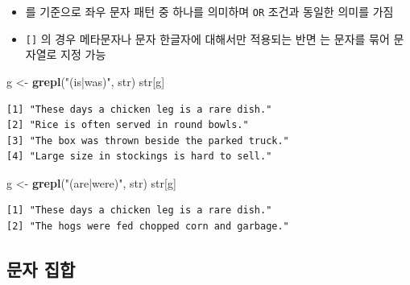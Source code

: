 \documentclass[
  11pt,
]{krantz}
\newenvironment{Shaded}{\begin{snugshade}}{\end{snugshade}}
\newcommand{\KeywordTok}[1]{\textcolor[rgb]{0.27,0.27,0.27}{\textbf{#1}}}
\newcommand{\NormalTok}[1]{#1}
\newcommand{\StringTok}[1]{\textcolor[rgb]{0.5,0.5,0.5}{#1}}
\providecommand{\tightlist}{%
  \setlength{\itemsep}{0pt}\setlength{\parskip}{0pt}}
\begin{document}
\begin{itemize}
\tightlist
\item
  \texttt{\textbar{}}를 기준으로 좌우 문자 패턴 중 하나를 의미하며 \texttt{OR} 조건과 동일한 의미를 가짐
\item
  \texttt{{[}{]}} 의 경우 메타문자나 문자 한글자에 대해서만 적용되는 반면 \texttt{\textbar{}}는 문자를 묶어 문자열로 지정 가능
\end{itemize}

\footnotesize

\begin{Shaded}
\begin{Highlighting}[]
\NormalTok{g <-}\StringTok{ }\KeywordTok{grepl}\NormalTok{(}\StringTok{"(is|was)"}\NormalTok{, str)}
\NormalTok{str[g]}
\end{Highlighting}
\end{Shaded}

\begin{verbatim}
[1] "These days a chicken leg is a rare dish."   
[2] "Rice is often served in round bowls."       
[3] "The box was thrown beside the parked truck."
[4] "Large size in stockings is hard to sell."   
\end{verbatim}

\begin{Shaded}
\begin{Highlighting}[]
\NormalTok{g <-}\StringTok{ }\KeywordTok{grepl}\NormalTok{(}\StringTok{"(are|were)"}\NormalTok{, str)}
\NormalTok{str[g]}
\end{Highlighting}
\end{Shaded}

\begin{verbatim}
[1] "These days a chicken leg is a rare dish."   
[2] "The hogs were fed chopped corn and garbage."
\end{verbatim}

\normalsize

\hypertarget{character-set}{%
\subsection{문자 집합}\label{character-set}}

\footnotesize
\end{document}
